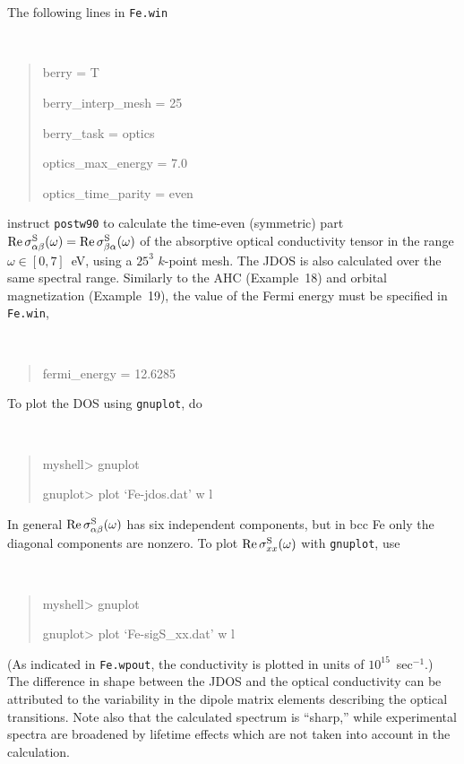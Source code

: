 \documentclass[a4paper,11pt,twoside]{article}
\begin{document}
The following lines in {\tt Fe.win}
%
{\tt
\begin{quote}
berry = T

berry\_interp\_mesh = 25

berry\_task = optics

optics\_max\_energy = 7.0

optics\_time\_parity = even 

\end{quote} }
%
instruct {\tt postw90} to calculate the time-even (symmetric) part
${\rm Re}\,\sigma^{\rm S}_{\alpha\beta}(\omega)={\rm Re}\,\sigma^{\rm
  S}_{\beta\alpha}(\omega)$ of the absorptive optical conductivity
tensor in the range $\omega\in [0,7]$~eV, using a $25^3$ $k$-point
mesh. The JDOS is also calculated over the same spectral
range. Similarly to the AHC (Example~18) and orbital magnetization
(Example~19), the value of the Fermi energy must be specified in {\tt
  Fe.win},
%
{\tt
\begin{quote}
fermi\_energy = 12.6285
\end{quote}
}

To plot the DOS using {\tt gnuplot}, do
%
{\tt
\begin{quote}
myshell> gnuplot

gnuplot> plot `Fe-jdos.dat' w l
\end{quote} }

In general ${\rm Re}\,\sigma^{\rm S}_{\alpha\beta}(\omega)$ has six independent
components, but in bcc Fe only the diagonal components are nonzero. 
To plot ${\rm Re}\,\sigma^{\rm S}_{xx}(\omega)$ with {\tt gnuplot},
use
%
{\tt
\begin{quote} myshell> gnuplot

gnuplot> plot `Fe-sigS\_xx.dat' w l
\end{quote} }
%
(As indicated in {\tt Fe.wpout}, the conductivity is plotted in units
of $10^{15}$~sec$^{-1}$.) The difference in shape between the JDOS and
the optical conductivity can be attributed to the variability in the
dipole matrix elements describing the optical transitions.  Note also
that the calculated spectrum is ``sharp,'' while experimental spectra
are broadened by lifetime effects which are not taken into account in
the calculation.
\end{document}
